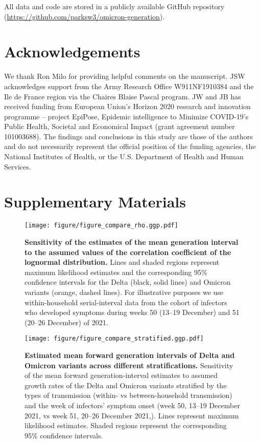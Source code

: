\documentclass[12pt]{article}
\begin{document}
All data and code are stored in a publicly available GitHub repository (\url{https://github.com/parksw3/omicron-generation}).

\section*{Acknowledgements}

We thank Ron Milo for providing helpful comments on the manuscript. JSW acknowledges support from the Army Research Office W911NF1910384 and the Ile de France region via the Chaires Blaise Pascal program. JW and JB has received funding from European Union's Horizon 2020 research and innovation programme -- project EpiPose, Epidemic intelligence to Minimize COVID-19’s Public Health, Societal and Economical Impact (grant agreement number 101003688). The findings and conclusions in this study are those of the authors and do not necessarily represent the official position of the funding agencies, the National Institutes of Health, or the U.S. Department of Health and Human Services.

\pagebreak

\section*{Supplementary Materials}
\setcounter{figure}{0}
\renewcommand{\thefigure}{S\arabic{figure}}

\begin{figure}[!th]
\texttt{[image: figure/figure\_compare\_rho.ggp.pdf]}
\caption{
\textbf{Sensitivity of the estimates of the mean generation interval to the assumed values of the correlation coefficient of the lognormal distribution.}
Lines and shaded regions represent maximum likelihood estimates and the corresponding 95\% confidence intervals for the Delta (black, solid lines) and Omicron variants (orange, dashed lines).
For illustrative purposes we use within-household serial-interval data from the cohort of infectors who developed symptoms during weeks 50 (13--19 December) and 51 (20--26 December) of 2021.
}
\end{figure}

\pagebreak

\begin{figure}[!th]
\texttt{[image: figure/figure\_compare\_stratified.ggp.pdf]}
\caption{
\textbf{Estimated mean forward generation intervals of Delta and Omicron variants across different stratifications.}
Sensitivity of the mean forward generation-interval estimates to assumed growth rates of the Delta and Omicron variants stratified by the types of transmission (within- vs between-household transmission) and the week of infectors' symptom onset (week 50, 13--19 December 2021, vs week 51, 20--26 December 2021,).
Lines represent maximum likelihood estimates.
Shaded regions represent the corresponding 95\% confidence intervals.
}
\end{figure}
\end{document}
